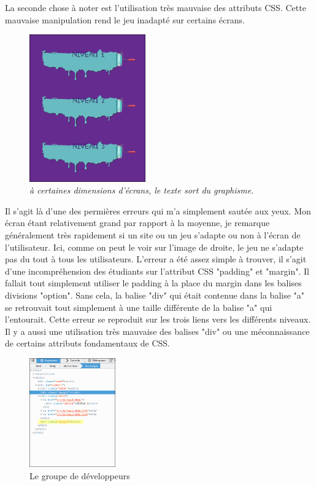 \documentclass{article}
\begin{document}
La seconde chose à noter est l'utilisation très mauvaise des attributs CSS. Cette mauvaise manipulation rend le jeu inadapté sur certains écrans.\\
\begin{figure}
\vspace{-13pt}
\centering
\includegraphics[width=5cm]{1}
\caption{\textit{à certaines dimensions d'écrans, le texte sort du graphisme.}}
\end{figure}
Il s'agit là d'une des permières erreurs qui m'a simplement sautée aux yeux. Mon écran étant relativement grand par rapport à la moyenne, je remarque généralement très rapidement si un site ou un jeu s'adapte ou non à l'écran de l'utilisateur. Ici, comme on peut le voir sur l'image de droite, le jeu ne s'adapte pas du tout à tous les utilisateurs. L'erreur a été assez simple à trouver, il s'agit d'une incompréhension des étudiants sur l'attribut CSS "padding" et "margin". Il fallait tout simplement utiliser le padding à la place du margin dans les balises divisions "option". Sans cela, la balise "div" qui était contenue dans la balise "a" se retrouvait tout simplement à une taille différente de la balise "a" qui l'entourait. Cette erreur se reproduit sur les trois liens vers les différents niveaux.\\

Il y a aussi une utilisation très mauvaise des balises "div" ou une méconnaissance de certains attributs fondamentaux de CSS.\\


\begin{figure}
  \vspace{-20pt}
  \begin{center}
    \includegraphics[width=0.33\textwidth]{3}
  \end{center}
  \vspace{-20pt}
  \caption{Le groupe de développeurs}
  \vspace{-10pt}
\end{figure}
\end{document}
